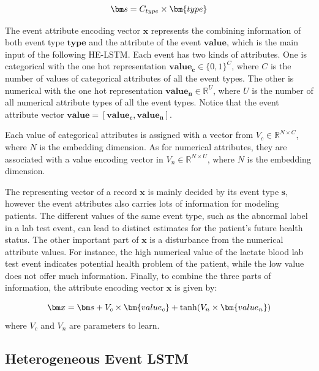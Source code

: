 \documentclass[letterpaper]{article} %
\begin{document}
\begin{equation}
\setlength{\abovedisplayskip}{3pt}
\bm s = C_{type} \times \bm{type}
\setlength{\belowdisplayskip}{3pt}
\end{equation}

The event attribute encoding vector $\bm x$ represents the combining information of both event type $\bm{type}$ and the attribute of the event $\bm{value}$, which is the main input of the following HE-LSTM.
Each event has two kinds of attributes. One is categorical with the one hot representation $\bm{value_c} \in \{0,1\}^{C}$, where $C$ is the number of values of categorical attributes of all the event types. The other is numerical with the one hot representation $\bm{value_n}\in \mathbb{R}^{U}$, where $U$ is the number of all numerical attribute  types of all the event types. Notice that the event attribute vector $\bm{value} =  \left[ \bm{value_c},\bm{value_n} \right]$.

Each value of categorical attributes is assigned with a vector from $V_c \in \mathbb{R}^{N \times C}$, where $N$ is the embedding dimension.
As for numerical attributes, they are associated with a value encoding vector in
$V_n \in \mathbb{R}^{N \times U}$, where $N$ is the embedding dimension.

The representing vector of a record $\bm x$ is mainly decided by its event type $\bm s$, however the event attributes  also carries lots of information for modeling patients.
The different values of the same event type, such as the abnormal label in a lab test event, can lead to distinct estimates for the patient's future health status. The other important part of $\bm x$ is a disturbance from the numerical attribute values. For instance, the high numerical value of the lactate blood lab test event indicates potential health problem of the patient, while the low value does not offer much information.
Finally, to combine the three parts of information, the attribute encoding vector  $\bm x$ is given by:


\begin{equation}
\setlength{\abovedisplayskip}{3pt}
\bm x = \bm s + V_c \times \bm{value_c} + \tanh( V_n \times \bm{value_n})
\setlength{\belowdisplayskip}{3pt}
\end{equation}
where   $V_c$ and $V_n$  are parameters to learn.

\subsection{Heterogeneous Event LSTM}
    
\end{document}
